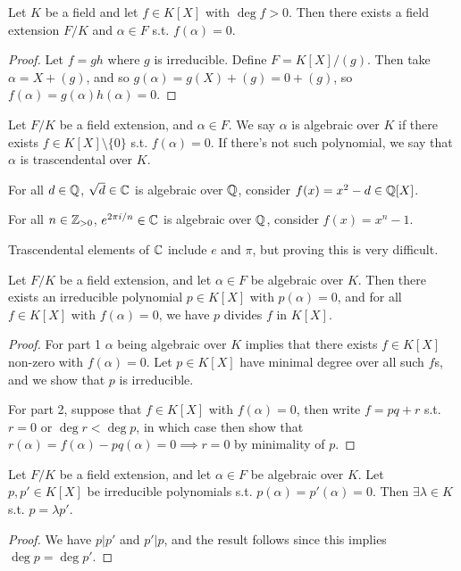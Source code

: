 \begin{theorem}
  Let $K$ be a field and let $f\in K[X]$ with $\deg f>0$. Then there exists a field
  extension $F/K$ and $\alpha \in F$ s.t. $f(\alpha)=0$.
\end{theorem}
\begin{proof}
  Let $f=gh$ where $g$ is irreducible. Define $F=K[X]/(g)$. Then take $\alpha=X+(g)$, and
  so $g(\alpha)=g(X)+(g)=0+(g)$, so $f(\alpha)=g(\alpha)h(\alpha)=0$.
\end{proof}

\begin{definition}
  Let $F/K$ be a field extension, and $\alpha\in F$. We say $\alpha$ is algebraic over
  $K$ if there exists $f\in K[X]\setminus \{0\}$ s.t. $f(\alpha)=0$. If there's not such
  polynomial, we say that $\alpha$ is trascendental over $K$.
\end{definition}

\begin{example}
  For all $d\in \mathbb Q$, $\sqrt{d}\in\mathbb C$ is algebraic over $\mathbb Q$, consider
  $f(x)=x^2-d\in\mathbb Q[X]$.

  For all $n\in\mathbb Z_{>0}$, $e^{2\pi i/n}\in \mathbb C$ is algebraic over $\mathbb Q$, consider
  $f(x)=x^n-1$.

  Trascendental elements of $\mathbb C$ include $e$ and $\pi$, but proving this is very
  difficult.
\end{example}

\begin{theorem}
  Let $F/K$ be a field extension, and let $\alpha\in F$ be algebraic over $K$.
  Then there exists an irreducible polynomial $p\in K[X]$ with $p(\alpha)=0$, and for
  all $f\in K[X]$ with $f(\alpha)=0$, we have $p$ divides $f$ in $K[X]$.
\end{theorem}
\begin{proof}
  For part 1 $\alpha$ being algebraic over $K$ implies that there exists $f\in K[X]$
  non-zero with $f(\alpha)=0$. Let $p\in K[X]$ have minimal degree over all such $f$s, and
  we show that $p$ is irreducible.

  For part 2, suppose that $f\in K[X]$ with $f(\alpha)=0$, then write $f=pq+r$ s.t. $r=0$
  or $\deg r <\deg p$, in which case then show that
  $r(\alpha)=f(\alpha)-pq(\alpha)=0\implies r=0$ by minimality of $p$.
\end{proof}

\begin{corollary}
  Let $F/K$ be a field extension, and let $\alpha\in F$ be algebraic over $K$. Let
  $p,p'\in K[X]$ be irreducible polynomials s.t. $p(\alpha)=p'(\alpha)=0$. Then
  $\exists\lambda\in K$ s.t. $p=\lambda p'$.
\end{corollary}
\begin{proof}
  We have $p|p'$ and $p'|p$, and the result follows since this implies $\deg p=\deg p'$.
\end{proof}

